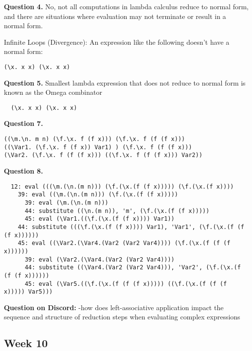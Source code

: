 \documentclass{article}
\theoremstyle{theorem}
\theoremstyle{definition}
\theoremstyle{remark}
\begin{document}
\textbf{Question 4.}
No, not all computations in lambda calculus reduce to normal form, and there are situations where evaluation may not terminate or result in a normal form.

Infinite Loops (Divergence): An expression like the following doesn't have a normal form:

\begin{verbatim}
(\x. x x) (\x. x x)
\end{verbatim}

\textbf{Question 5.}
Smallest lambda expression that does not reduce to normal form is known as the Omega combinator

\begin{verbatim}
  (\x. x x) (\x. x x)
\end{verbatim}

\textbf{Question 7.}

\begin{verbatim}
((\m.\n. m n) (\f.\x. f (f x))) (\f.\x. f (f (f x)))
((\Var1. (\f.\x. f (f x)) Var1) ) (\f.\x. f (f (f x)))
(\Var2. (\f.\x. f (f (f x))) ((\f.\x. f (f (f x))) Var2))
\end{verbatim}

\textbf{Question 8.}

\begin{verbatim}
  12: eval (((\m.(\n.(m n))) (\f.(\x.(f (f x))))) (\f.(\x.(f x))))
    39: eval ((\m.(\n.(m n))) (\f.(\x.(f (f x)))))
      39: eval (\m.(\n.(m n)))
      44: substitute ((\n.(m n)), 'm', (\f.(\x.(f (f x)))))
      45: eval (\Var1.((\f.(\x.(f (f x)))) Var1))
    44: substitute (((\f.(\x.(f (f x)))) Var1), 'Var1', (\f.(\x.(f (f (f x))))))
    45: eval ((\Var2.(\Var4.(Var2 (Var2 Var4)))) (\f.(\x.(f (f (f x))))))
      39: eval (\Var2.(\Var4.(Var2 (Var2 Var4))))
      44: substitute ((\Var4.(Var2 (Var2 Var4))), 'Var2', (\f.(\x.(f (f (f x))))))
      45: eval (\Var5.((\f.(\x.(f (f (f x))))) ((\f.(\x.(f (f (f x))))) Var5)))
\end{verbatim}


\textbf{Question on Discord:} -how does left-associative application impact the sequence and structure of reduction steps when evaluating complex expressions

\subsection{Week 10}
\end{document}

